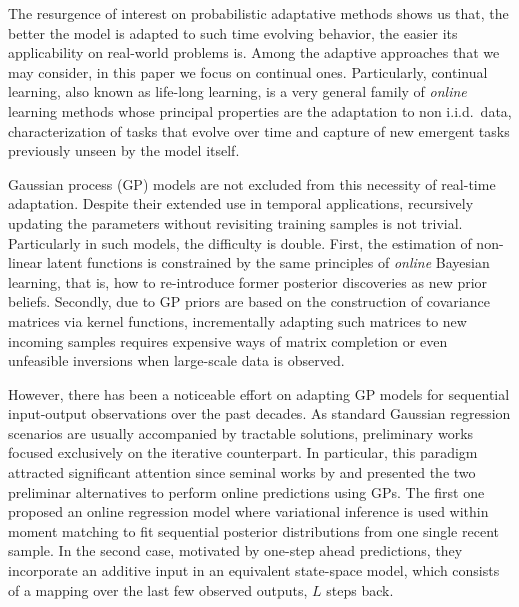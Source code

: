 \documentclass[]{article}
\begin{document}
The resurgence of  interest on probabilistic adaptative methods shows us that, the better the model is adapted to such time evolving behavior, the easier its applicability on real-world problems is. Among the adaptive approaches that we may consider, in this paper we focus on continual ones. Particularly, continual learning, also known as life-long learning, is a very general family of \textit{online} learning methods whose principal properties are the adaptation to non i.i.d.\ data, characterization of tasks that evolve over time and capture of new emergent tasks previously unseen by the model itself.



Gaussian process (GP) models \citep{rasmussen2006gaussian} are not excluded from this necessity of real-time adaptation. Despite their extended use in temporal applications, recursively updating the parameters without revisiting training samples is not trivial. Particularly in such models, the difficulty is double. First, the estimation of non-linear latent functions is constrained by the same principles of \textit{online} Bayesian learning, that is, how to re-introduce  former posterior discoveries as new prior beliefs. Secondly, due to GP priors are based on the construction of covariance matrices via kernel functions, incrementally adapting such matrices to new incoming samples requires expensive ways of matrix completion or even unfeasible inversions when large-scale data is observed.

However, there has been a noticeable effort on adapting GP models for sequential input-output observations over the past decades. As standard Gaussian regression scenarios are usually accompanied by tractable solutions, preliminary works focused exclusively on the iterative counterpart. In particular, this paradigm attracted significant attention since seminal works by \citet{csato2002sparse} and \citet{girard2003gaussian} presented the two preliminar alternatives to perform online predictions using GPs. The first one proposed an online regression model where variational inference is used within moment matching to fit sequential posterior distributions from one single recent sample. In the second case, motivated by one-step ahead predictions, they incorporate an additive input in an equivalent state-space model, which consists of a mapping over the last few observed outputs, $L$ steps back.
\end{document}
